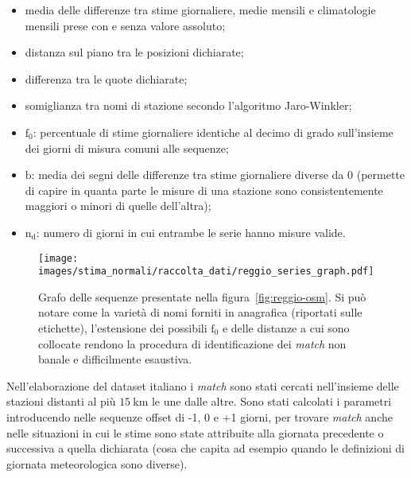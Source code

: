 \begin{itemize}
  \item
    media delle differenze tra stime giornaliere, medie mensili e climatologie mensili prese con e senza valore assoluto;
  \item
    distanza sul piano tra le posizioni dichiarate;
  \item
    differenza tra le quote dichiarate;
  \item
    somiglianza tra nomi di stazione secondo l'algoritmo Jaro-Winkler;
  \item
    \(\mathrm{f}_0\): percentuale di stime giornaliere identiche al decimo di grado sull'insieme dei giorni di misura comuni alle sequenze;
  \item
    \(\mathrm{b}\): media dei segni delle differenze tra stime giornaliere diverse da 0 (permette di capire in quanta parte le misure di una stazione sono consistentemente maggiori o minori di quelle dell'altra);
  \item
    \(\mathrm{n_d}\): numero di giorni in cui entrambe le serie hanno misure valide.
\end{itemize}

\begin{figure}[ht]
  \texttt{[image: images/stima\_normali/raccolta\_dati/reggio\_series\_graph.pdf]}
  \caption{Grafo delle sequenze presentate nella figura~\ref{fig:reggio-osm}. Si può notare come la varietà di nomi forniti in anagrafica (riportati sulle etichette), l'estensione dei possibili \(\mathrm{f}_0\) e delle distanze a cui sono collocate rendono la procedura di identificazione dei \emph{match} non banale e difficilmente esaustiva.}\label{fig:reggio-graph}
\end{figure}

Nell'elaborazione del dataset italiano i \emph{match} sono stati cercati nell'insieme delle stazioni distanti al più \(15\:\mathrm{km}\) le une dalle altre. Sono stati calcolati i parametri introducendo nelle sequenze offset di -1, 0 e +1 giorni, per trovare \emph{match} anche nelle situazioni in cui le stime sono state attribuite alla giornata precedente o successiva a quella dichiarata (cosa che capita ad esempio quando le definizioni di giornata meteorologica sono diverse).

